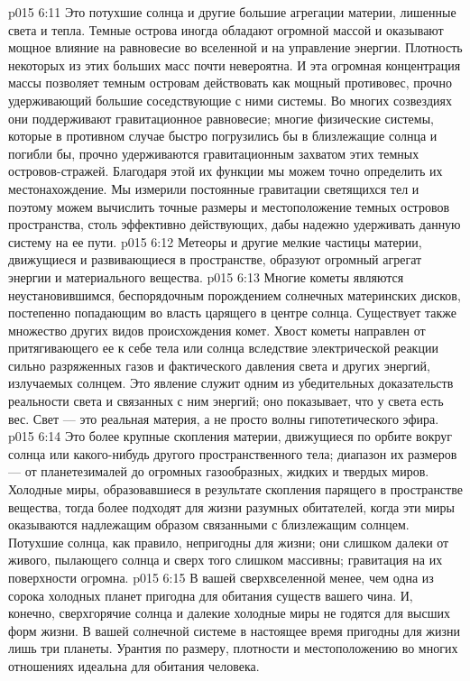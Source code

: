 \vs p015 6:11 \pc {} Это потухшие солнца и другие большие агрегации материи, лишенные света и тепла. Темные острова иногда обладают огромной массой и оказывают мощное влияние на равновесие во вселенной и на управление энергии. Плотность некоторых из этих больших масс почти невероятна. И эта огромная концентрация массы позволяет темным островам действовать как мощный противовес, прочно удерживающий большие соседствующие с ними системы. Во многих созвездиях они поддерживают гравитационное равновесие; многие физические системы, которые в противном случае быстро погрузились бы в близлежащие солнца и погибли бы, прочно удерживаются гравитационным захватом этих темных островов\hyp{}стражей. Благодаря этой их функции мы можем точно определить их местонахождение. Мы измерили постоянные гравитации светящихся тел и поэтому можем вычислить точные размеры и местоположение темных островов пространства, столь эффективно действующих, дабы надежно удерживать данную систему на ее пути.
\vs p015 6:12 \pc {} Метеоры и другие мелкие частицы материи, движущиеся и развивающиеся в пространстве, образуют огромный агрегат энергии и материального вещества.
\vs p015 6:13 Многие кометы являются неустановившимся, беспорядочным порождением солнечных материнских дисков, постепенно попадающим во власть царящего в центре солнца. Существует также множество других видов происхождения комет. Хвост кометы направлен от притягивающего ее к себе тела или солнца вследствие электрической реакции сильно разряженных газов и фактического давления света и других энергий, излучаемых солнцем. Это явление служит одним из убедительных доказательств реальности света и связанных с ним энергий; оно показывает, что у света есть вес. Свет --- это реальная материя, а не просто волны гипотетического эфира.
\vs p015 6:14 \pc {} Это более крупные скопления материи, движущиеся по орбите вокруг солнца или какого\hyp{}нибудь другого пространственного тела; диапазон их размеров --- от планетезималей до огромных газообразных, жидких и твердых миров. Холодные миры, образовавшиеся в результате скопления парящего в пространстве вещества, тогда более подходят для жизни разумных обитателей, когда эти миры оказываются надлежащим образом связанными с близлежащим солнцем. Потухшие солнца, как правило, непригодны для жизни; они слишком далеки от живого, пылающего солнца и сверх того слишком массивны; гравитация на их поверхности огромна.
\vs p015 6:15 В вашей сверхвселенной менее, чем одна из сорока холодных планет пригодна для обитания существ вашего чина. И, конечно, сверхгорячие солнца и далекие холодные миры не годятся для высших форм жизни. В вашей солнечной системе в настоящее время пригодны для жизни лишь три планеты. Урантия по размеру, плотности и местоположению во многих отношениях идеальна для обитания человека.

